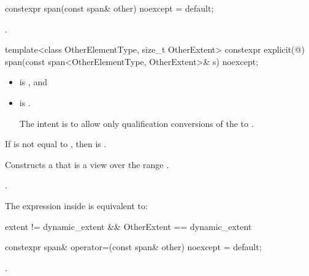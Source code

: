 %
\begin{itemdecl}
constexpr span(const span& other) noexcept = default;
\end{itemdecl}

\begin{itemdescr}
\pnum
\ensures
{}.
\end{itemdescr}

%
\begin{itemdecl}
template<class OtherElementType, size_t OtherExtent>
  constexpr explicit(@\seebelow@) span(const span<OtherElementType, OtherExtent>& s) noexcept;
\end{itemdecl}

\begin{itemdescr}
\pnum
\constraints
\begin{itemize}
\item {} \tcode{||}  \tcode{||}  is , and
\item {} is .
\begin{note}
The intent is to allow only qualification conversions
of the  to .
\end{note}
\end{itemize}

\pnum
\hardexpects
If  is not equal to ,
then  is .

\pnum
\effects
Constructs a  that is a view over the range
.

\pnum
\ensures
{}.

\pnum
\remarks
The expression inside  is equivalent to:
\begin{codeblock}
extent != dynamic_extent && OtherExtent == dynamic_extent
\end{codeblock}
\end{itemdescr}

%
\begin{itemdecl}
constexpr span& operator=(const span& other) noexcept = default;
\end{itemdecl}

\begin{itemdescr}
\pnum
\ensures
{}.
\end{itemdescr}

